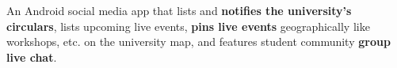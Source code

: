 \documentclass[]{resume-openfont}
\begin{document}
\begin{minipage}[t]{0.66\textwidth}
An Android social media app that lists and \textbf{notifies the university's circulars}, lists upcoming live events, \textbf{pins live events} geographically like workshops, etc. on the university map, and features student community \textbf{group live chat}.
\sectionsep

\end{minipage}
\end{document}
